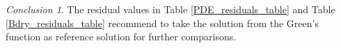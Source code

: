 \documentclass[a4paper,11pt]{article}
\theoremstyle{plain} %
\theoremstyle{definition} %
\theoremstyle{remark} %
\theoremstyle{remark}
\newtheorem*{conclusion}{Conclusion}
\begin{document}
\begin{conclusion}
The residual values in Table \ref{PDE_residuals_table} and Table \ref{Bdry_residuals_table} recommend to take the solution from the Green's function as reference solution for further comparisons.
\end{conclusion}

\end{document}
